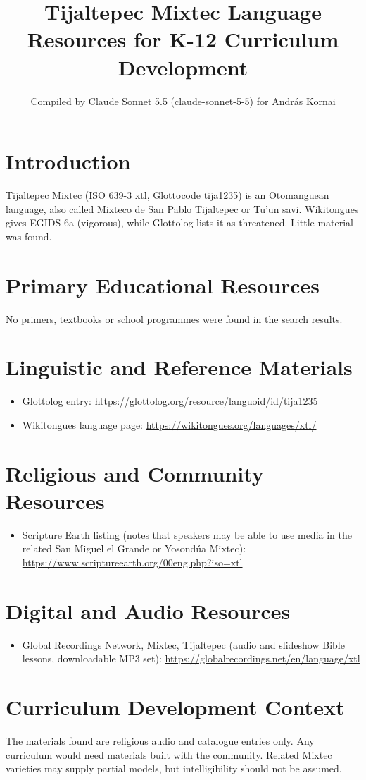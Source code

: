 \documentclass[12pt]{article}
\title{Tijaltepec Mixtec Language Resources for K-12 Curriculum Development}
\author{Compiled by Claude Sonnet 5.5 (claude-sonnet-5-5) for Andr\'as Kornai}
\date{}
\begin{document}
\maketitle
\section{Introduction}
Tijaltepec Mixtec (ISO 639-3 xtl, Glottocode tija1235) is an Otomanguean language, also called Mixteco de San Pablo Tijaltepec or Tu'un savi. Wikitongues gives EGIDS 6a (vigorous), while Glottolog lists it as threatened. Little material was found.
\section{Primary Educational Resources}
No primers, textbooks or school programmes were found in the search results.
\section{Linguistic and Reference Materials}
\begin{itemize}
\item Glottolog entry: \url{https://glottolog.org/resource/languoid/id/tija1235}
\item Wikitongues language page: \url{https://wikitongues.org/languages/xtl/}
\end{itemize}
\section{Religious and Community Resources}
\begin{itemize}
\item Scripture Earth listing (notes that speakers may be able to use media in the related San Miguel el Grande or Yosond\'ua Mixtec): \url{https://www.scriptureearth.org/00eng.php?iso=xtl}
\end{itemize}
\section{Digital and Audio Resources}
\begin{itemize}
\item Global Recordings Network, Mixtec, Tijaltepec (audio and slideshow Bible lessons, downloadable MP3 set): \url{https://globalrecordings.net/en/language/xtl}
\end{itemize}
\section{Curriculum Development Context}
The materials found are religious audio and catalogue entries only. Any curriculum would need materials built with the community. Related Mixtec varieties may supply partial models, but intelligibility should not be assumed.
\end{document}
